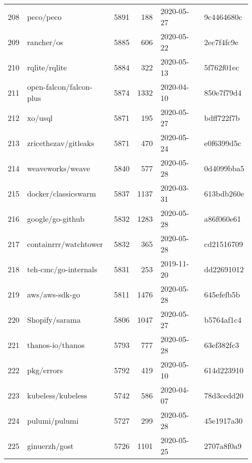 \begin{longtable}{llrrll}
    208 &                                          peco/peco &   5891 &    188 & 2020-05-27 &  9c4464680c \\
    209 &                                         rancher/os &   5885 &    606 & 2020-05-22 &  2ec7f4fc9e \\
    210 &                                      rqlite/rqlite &   5884 &    322 & 2020-05-13 &  5f762f01ec \\
    211 &                            open-falcon/falcon-plus &   5874 &   1332 & 2020-04-10 &  850e7f79d4 \\
    212 &                                            xo/usql &   5871 &    195 & 2020-05-27 &  bdff722f7b \\
    213 &                               zricethezav/gitleaks &   5871 &    470 & 2020-05-24 &  e0f6399d5c \\
    214 &                                   weaveworks/weave &   5840 &    577 & 2020-05-28 &  0d4099bba5 \\
    215 &                                docker/classicswarm &   5837 &   1137 & 2020-03-31 &  613bdb260e \\
    216 &                                   google/go-github &   5832 &   1283 & 2020-05-28 &  a86f060e61 \\
    217 &                              containrrr/watchtower &   5832 &    365 & 2020-05-28 &  cd21516709 \\
    218 &                               teh-cmc/go-internals &   5831 &    253 & 2019-11-20 &  dd22691012 \\
    219 &                                     aws/aws-sdk-go &   5811 &   1476 & 2020-05-28 &  645efefb5b \\
    220 &                                     Shopify/sarama &   5806 &   1047 & 2020-05-27 &  b5764af1c4 \\
    221 &                                   thanos-io/thanos &   5793 &    777 & 2020-05-28 &  63ef382fc3 \\
    222 &                                         pkg/errors &   5792 &    419 & 2020-05-10 &  614d223910 \\
    223 &                                  kubeless/kubeless &   5742 &    586 & 2020-04-07 &  78d3cedd20 \\
    224 &                                      pulumi/pulumi &   5727 &    299 & 2020-05-28 &  45e1917a30 \\
    225 &                                      ginuerzh/gost &   5726 &   1101 & 2020-05-25 &  2707a8f0a9 \\

\end{longtable}
